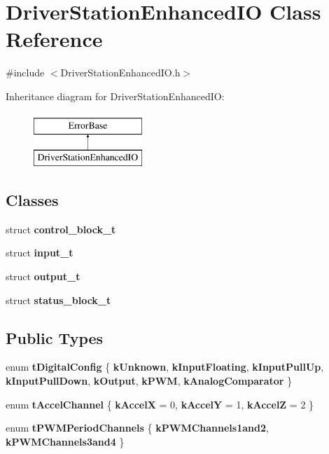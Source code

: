 \hypertarget{classDriverStationEnhancedIO}{\section{\-Driver\-Station\-Enhanced\-I\-O \-Class \-Reference}
\label{classDriverStationEnhancedIO}
}


{\ttfamily \#include $<$\-Driver\-Station\-Enhanced\-I\-O.\-h$>$}

\-Inheritance diagram for \-Driver\-Station\-Enhanced\-I\-O\-:\begin{figure}[H]
\begin{center}
\leavevmode
\includegraphics[height=2.000000cm]{classDriverStationEnhancedIO}
\end{center}
\end{figure}
\subsection*{\-Classes}
\begin{DoxyCompactItemize}
\item 
struct {\bfseries control\-\_\-block\-\_\-t}
\item 
struct {\bfseries input\-\_\-t}
\item 
struct {\bfseries output\-\_\-t}
\item 
struct {\bfseries status\-\_\-block\-\_\-t}
\end{DoxyCompactItemize}
\subsection*{\-Public \-Types}
\begin{DoxyCompactItemize}
\item 
enum {\bfseries t\-Digital\-Config} \{ \*
{\bfseries k\-Unknown}, 
{\bfseries k\-Input\-Floating}, 
{\bfseries k\-Input\-Pull\-Up}, 
{\bfseries k\-Input\-Pull\-Down}, 
\*
{\bfseries k\-Output}, 
{\bfseries k\-P\-W\-M}, 
{\bfseries k\-Analog\-Comparator}
 \}
\item 
enum {\bfseries t\-Accel\-Channel} \{ {\bfseries k\-Accel\-X} =  0, 
{\bfseries k\-Accel\-Y} =  1, 
{\bfseries k\-Accel\-Z} =  2
 \}
\item 
enum {\bfseries t\-P\-W\-M\-Period\-Channels} \{ {\bfseries k\-P\-W\-M\-Channels1and2}, 
{\bfseries k\-P\-W\-M\-Channels3and4}
 \}
\end{DoxyCompactItemize}
